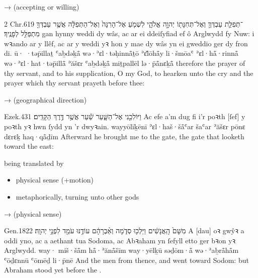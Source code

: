 \begin{frame}{\exwref {} →  (accepting or willing)}
	\exstep
	\begin{example}{2 Chr.}{6}{19}{}{}
		\quoling
		{ ־תְּפִלַּ֧ת עַבְדְּךָ֛ וְאֶל־תְּחִנָּת֖וֹ יְהוָ֣ה אֱלֹהָ֑י לִשְׁמֹ֤עַ אֶל־הָרִנָּה֙ וְאֶל־הַתְּפִלָּ֔ה אֲשֶׁ֥ר עַבְדְּךָ֖ מִתְפַּלֵּ֥ל לְפָנֶֽיךָ׃}
		{ gan hynny  weddi dy wâs, ac ar ei ddeiſyfiad ef ô Arglwydd fy Nuw: i wꝛando ar y llêf, ac ar y weddi yꝛ hon y mae dy wâs yn ei gweddio ger dy fron di.}
		{ū· ·təp̄illaṯ ʿaḇdəḵå̄ wə·ʾɛl·təḥinnå̄ṯō {\YHWH} ʾɛ̆lōhå̄y li·šmōaʿ ʾɛl·hå̄·rinnå̄ wə·ʾɛl·hat·təp̄illå̄ ʾăšɛr ʿaḇdəḵå̄ miṯpallēl lə·p̄å̄nɛḵå̄}
		{ therefore  the prayer of thy servant, and to his supplication, O {\LORD} my God, to hearken unto the cry and the prayer which thy servant prayeth before thee:}
	\end{example}
\end{frame}


\begin{frame}{\exwref {} →  (geographical direction)}
	\exstep
	\begin{example}{Ezek.}{43}{1}{}{}
		\quoling
		{וַיּוֹלִכֵ֖נִי אֶל־הַשָּׁ֑עַר שַׁ֕עַר אֲשֶׁ֥ר  דֶּ֥רֶךְ הַקָּדִֽים׃}
		{Ac efe a’m dug fi i’r poꝛth [ſef] y poꝛth yꝛ hwn ſydd yn   ’r dwyꝛain.}
		{wayyōlīḵēnī ʾɛl·haš·šå̄ʿar šaʿar ʾăšɛr pōnɛ dɛrɛḵ haq·qå̄ḏīm}
		{Afterward he brought me to the gate,  the gate that looketh toward the east:}
	\end{example}
\end{frame}


\begin{frame}{ being translated by }
	\begin{itemize}
		\item physical sense (+motion)\hfill{}
		\item metaphorically, turning unto other gods\hfill{}
	\end{itemize}
\end{frame}


\begin{frame}{\exwref {} →  (physical sense)}
	\exstep
	\begin{example}{Gen.}{18}{22}{}{}
		\quoling
		{ מִשָּׁם֙ הָֽאֲנָשִׁ֔ים וַיֵּלְכ֖וּ סְדֹ֑מָה וְאַ֨בְרָהָ֔ם עוֹדֶ֥נּוּ עֹמֵ֖ד לִפְנֵ֥י יְהוָֽה׃}
		{A [dau] oꝛ gwŷꝛ a  oddi yno, ac a aethant tua Sodoma, ac Abꝛaham yn ſefyll  etto ger bꝛon yꝛ Arglwydd.}
		{way· miš·šå̄m hå̄·ʾănå̄šīm way·yēlḵū səḏōm·å̄ wə·ʾaḇrå̄hå̄m ʿōḏɛnnū ʿōmēḏ li·p̄nē {\YHWH}}
		{And the men  from thence, and went toward Sodom: but Abraham stood yet before the {\LORD}.}
	\end{example}
\end{frame}


